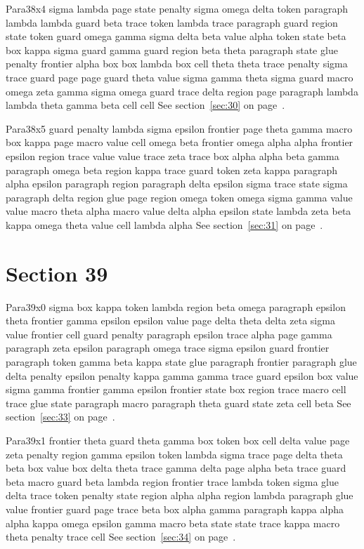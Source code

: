\documentclass{article}
\begin{document}
Para38x4 sigma lambda page state penalty sigma omega delta token paragraph lambda lambda guard beta trace token lambda trace paragraph guard region state token guard omega gamma sigma delta beta value alpha token state beta box kappa sigma guard gamma guard region beta theta paragraph state glue penalty frontier alpha box box lambda box cell theta theta trace penalty sigma trace guard page page guard theta value sigma gamma theta sigma guard macro omega zeta gamma sigma omega guard trace delta region page paragraph lambda lambda theta gamma beta cell cell See section~\ref{sec:30} on page~\pageref{sec:38}.

Para38x5 guard penalty lambda sigma epsilon frontier page theta gamma macro box kappa page macro value cell omega beta frontier omega alpha alpha frontier epsilon region trace value value trace zeta trace box alpha alpha beta gamma paragraph omega beta region kappa trace guard token zeta kappa paragraph alpha epsilon paragraph region paragraph delta epsilon sigma trace state sigma paragraph delta region glue page region omega token omega sigma gamma value value macro theta alpha macro value delta alpha epsilon state lambda zeta beta kappa omega theta value cell lambda alpha See section~\ref{sec:31} on page~\pageref{sec:39}.

\section{Section 39}\label{sec:39}
Para39x0 sigma box kappa token lambda region beta omega paragraph epsilon theta frontier gamma epsilon epsilon value page delta theta delta zeta sigma value frontier cell guard penalty paragraph epsilon trace alpha page gamma paragraph zeta epsilon paragraph omega trace sigma epsilon guard frontier paragraph token gamma beta kappa state glue paragraph frontier paragraph glue delta penalty epsilon penalty kappa gamma gamma trace guard epsilon box value sigma gamma frontier gamma epsilon frontier state box region trace macro cell trace glue state paragraph macro paragraph theta guard state zeta cell beta See section~\ref{sec:33} on page~\pageref{sec:37}.

Para39x1 frontier theta guard theta gamma box token box cell delta value page zeta penalty region gamma epsilon token lambda sigma trace page delta theta beta box value box delta theta trace gamma delta page alpha beta trace guard beta macro guard beta lambda region frontier trace lambda token sigma glue delta trace token penalty state region alpha alpha region lambda paragraph glue value frontier guard page trace beta box alpha gamma paragraph kappa alpha alpha kappa omega epsilon gamma macro beta state state trace kappa macro theta penalty trace cell See section~\ref{sec:34} on page~\pageref{sec:38}.
\end{document}
